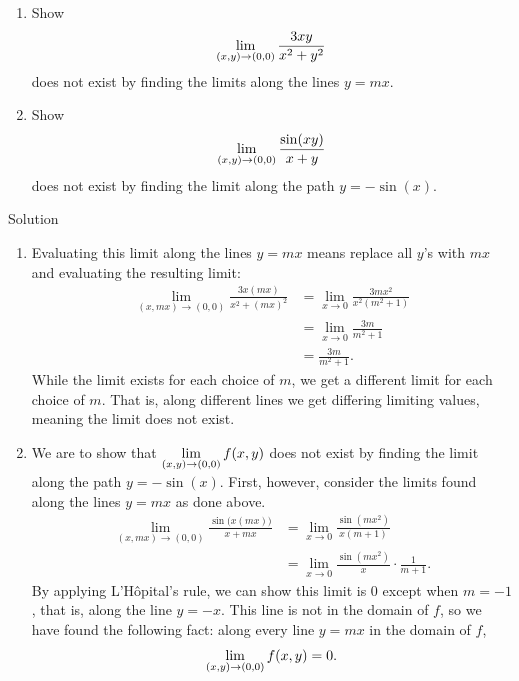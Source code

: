 \begin{example}\label{ex_multilimit4}
\begin{enumerate}
	\item Show $$\displaystyle \lim_{(x,y)\to (0,0)} \frac{3xy}{x^2+y^2}$$ does not exist by finding the limits along the lines $y=mx$.
	\item	Show $$\displaystyle \lim_{(x,y)\to (0,0)} \frac{\sin(xy)}{x+y}$$ does not exist by finding the limit along the path $y=-\sin (x)$. 	
\end{enumerate}

\pagebreak
{}Solution 

\begin{enumerate}
	\item Evaluating this limit along the lines $y=mx$ means replace all $y$'s with $mx$ and evaluating the resulting limit:
	\begin{align*}
	\lim_{(x,mx)\to (0,0)} \frac{3x(mx)}{x^2+(mx)^2} &=\lim_{x\to 0} \frac{3mx^2}{x^2(m^2+1)}\\[0.2cm]
				&= \lim_{x\to 0} \frac{3m}{m^2+1}\\[0.2cm]
				&= \frac{3m}{m^2+1}.
	\end{align*}
	While the limit exists for each choice of $m$, we get a different limit for each choice of $m$. That is, along different lines we get differing limiting values, meaning the limit does not exist.
	
	\item We are to show that $\displaystyle \lim_{(x,y)\to (0,0)} f(x,y)$ does not exist by finding the limit along the path $y=-\sin (x)$. First, however, consider the limits found along the lines $y=mx$ as done above.
	\begin{align*}
	\lim_{(x,mx)\to (0,0)} \frac{\sin\big(x(mx)\big)}{x+mx} &= \lim_{x\to 0} \frac{\sin (mx^2)}{x(m+1)} \\[0.2cm]
	&= \lim_{x\to 0} \frac{\sin(mx^2)}{x}\cdot\frac1{m+1}.
	\end{align*}
	By applying L'H\^opital's rule, we can show this limit is 0 except when $m=-1$, that is, along the line $y=-x$. This line is not in the domain of $f$, so we have found the following fact: along every line $y=mx$ in the domain of $f$, $$\displaystyle \lim_{(x,y)\to(0,0)} f(x,y)=0.$$ %
	

\end{enumerate}
\end{example}
